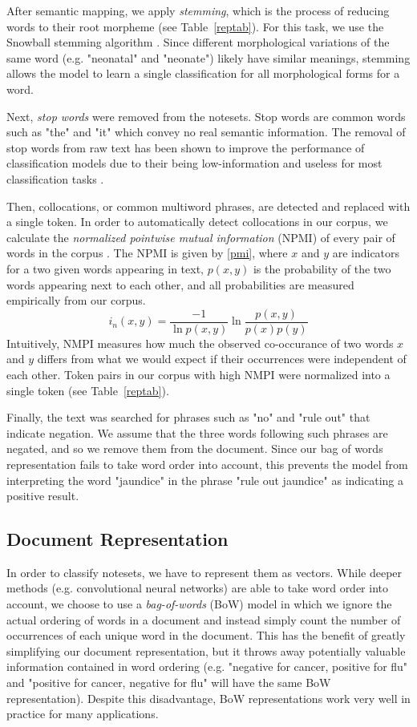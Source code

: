 \documentclass[conference]{IEEEtran}
\begin{document}
After semantic mapping, we apply \textit{stemming}, which is the process of reducing words to their root morpheme (see Table~\ref{reptab}). For this task, we use the Snowball stemming algorithm \cite{Porter}. Since different morphological variations of the same word (e.g. "neonatal" and "neonate") likely have similar meanings, stemming allows the model to learn  a single classification for all morphological forms for a word.

Next, \textit{stop words} were removed from the notesets. Stop words are common words such as "the" and "it" which convey no real semantic information. The removal of stop words from raw text has been shown to improve the performance of classification models due to their being low-information and useless for most classification tasks \cite{Silva}. 

Then, collocations, or common multiword phrases, are detected and replaced with a single token. In order to automatically detect collocations in our corpus, we calculate the \textit{normalized pointwise mutual information} (NPMI) of every pair of words in the corpus \cite{Bouma}. The NPMI is given by \eqref{pmi}, where $x$ and $y$ are indicators for a two given words appearing in text, $p(x,y)$ is the probability of the two words appearing next to each other, and all probabilities are measured empirically from our corpus.
\begin{equation}
i_n(x,y) = \frac{-1}{\ln p(x,y)}\ln \frac{p(x,y)}{p(x)p(y)}\label{pmi}
\end{equation}
Intuitively, NMPI measures how much the observed co-occurance of two words $x$ and $y$ differs from what we would expect if their occurrences were independent of each other. Token pairs in our corpus with high NMPI were normalized into a single token (see Table~\ref{reptab}).

Finally, the text was searched for phrases such as "no" and "rule out" that indicate negation. We assume that the three words following such phrases are negated, and so we remove them from the document. Since our bag of words representation fails to take word order into account, this prevents the model from interpreting the word "jaundice" in the phrase "rule out jaundice" as indicating a positive result. 
\subsection{Document Representation}\label{AA}
In order to classify notesets, we have to represent them as vectors. While deeper methods (e.g. convolutional neural networks) are able to take word order into account, we choose to use a \textit{bag-of-words} (BoW) model in which we ignore the actual ordering of words in a document and instead simply count the number of occurrences of each unique word in the document. This has the benefit of greatly simplifying our document representation, but it throws away potentially valuable information contained in word ordering (e.g. "negative for cancer, positive for flu" and "positive for cancer, negative for flu" will have the same BoW representation). Despite this disadvantage, BoW representations work very well in practice for many applications.
\end{document}
